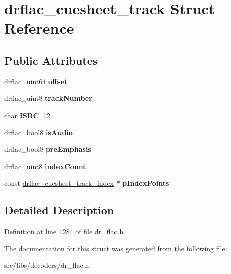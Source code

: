 \hypertarget{structdrflac__cuesheet__track}{\section{drflac\-\_\-cuesheet\-\_\-track Struct Reference}
\label{structdrflac__cuesheet__track}
}
\subsection*{Public Attributes}
\begin{DoxyCompactItemize}
\item 
\hypertarget{structdrflac__cuesheet__track_af4acb04ad8a738158e30b4ed04aa2d52}{drflac\-\_\-uint64 {\bfseries offset}}\label{structdrflac__cuesheet__track_af4acb04ad8a738158e30b4ed04aa2d52}

\item 
\hypertarget{structdrflac__cuesheet__track_a13814c554ba1fdfd4ee0a36b1a67ac79}{drflac\-\_\-uint8 {\bfseries track\-Number}}\label{structdrflac__cuesheet__track_a13814c554ba1fdfd4ee0a36b1a67ac79}

\item 
\hypertarget{structdrflac__cuesheet__track_a88cdb641ef9c8eb980a9015b5109b92c}{char {\bfseries I\-S\-R\-C} \mbox{[}12\mbox{]}}\label{structdrflac__cuesheet__track_a88cdb641ef9c8eb980a9015b5109b92c}

\item 
\hypertarget{structdrflac__cuesheet__track_a147088afc66faae21032d7d66864d64b}{drflac\-\_\-bool8 {\bfseries is\-Audio}}\label{structdrflac__cuesheet__track_a147088afc66faae21032d7d66864d64b}

\item 
\hypertarget{structdrflac__cuesheet__track_a3ca412c42208b2311031773d4159d50d}{drflac\-\_\-bool8 {\bfseries pre\-Emphasis}}\label{structdrflac__cuesheet__track_a3ca412c42208b2311031773d4159d50d}

\item 
\hypertarget{structdrflac__cuesheet__track_a28b2380499b6e79255c1084d4ba7a3b0}{drflac\-\_\-uint8 {\bfseries index\-Count}}\label{structdrflac__cuesheet__track_a28b2380499b6e79255c1084d4ba7a3b0}

\item 
\hypertarget{structdrflac__cuesheet__track_ad721b5c18e1c6e0c1988cd49a9f3ece5}{const \hyperlink{structdrflac__cuesheet__track__index}{drflac\-\_\-cuesheet\-\_\-track\-\_\-index} $\ast$ {\bfseries p\-Index\-Points}}\label{structdrflac__cuesheet__track_ad721b5c18e1c6e0c1988cd49a9f3ece5}

\end{DoxyCompactItemize}


\subsection{Detailed Description}


Definition at line 1284 of file dr\-\_\-flac.\-h.



The documentation for this struct was generated from the following file\-:\begin{DoxyCompactItemize}
\item 
src/libs/decoders/dr\-\_\-flac.\-h\end{DoxyCompactItemize}
